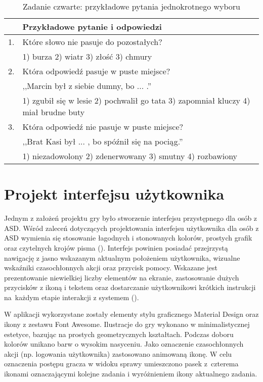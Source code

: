     \begin{table}
        \caption{Zadanie czwarte: przykładowe pytania jednokrotnego wyboru}
        \label{table:zadanie4}
        \begin{tabularx}{\textwidth}{ l X }
         \hline
        
         \hline
            & \textbf{Przykładowe pytanie i odpowiedzi} \\
         \hline
         1. & Które słowo nie pasuje do pozostałych? \\
            & 1) burza 2) wiatr 3) złość 3) chmury \\
         2. & Która odpowiedź pasuje w puste miejsce? \\
            & ,,Marcin był z siebie dumny, bo ... .'' \\
            & 1) zgubił się w lesie 2) pochwalił go tata 3) zapomniał kluczy 4) miał brudne buty \\
         3. & Która odpowiedź nie pasuje w puste miejsce? \\
            & ,,Brat Kasi był ... , bo spóźnił się na pociąg.'' \\
            & 1) niezadowolony 2) zdenerwowany 3) smutny 4) rozbawiony  \\
         \hline
         
         \hline
        \end{tabularx}
    \end{table}

\section{Projekt interfejsu użytkownika}
    Jednym z założeń projektu gry było stworzenie interfejsu przystępnego dla osób z ASD.
    Wśród zaleceń dotyczących projektowania interfejsu użytkownika dla osób z ASD wymienia się stosowanie łagodnych i stonowanych kolorów, prostych grafik oraz czytelnych krojów pisma (\cite{pavlov2014user}).
    Interfejs powinien posiadać przejrzystą nawigację z jasno wskazanym aktualnym położeniem użytkownika, wizualne wskaźniki czasochłonnych akcji oraz przycisk pomocy.
    Wskazane jest prezentowanie niewielkiej liczby elementów na ekranie, zastosowanie dużych przycisków z ikoną i tekstem oraz dostarczanie użytkownikowi krótkich instrukcji na~każdym etapie interakcji z systemem (\cite{pavlov2014user}).
    
    W aplikacji wykorzystane zostały elementy stylu graficznego Material Design oraz ikony z zestawu Font Awesome.
    Ilustracje do gry wykonano w minimalistycznej estetyce, bazując na prostych geometrycznych kształtach.
    Podczas doboru kolorów unikano barw o wysokim nasyceniu.
    Jako oznaczenie czasochłonnych akcji (np. logowania użytkownika) zastosowano animowaną ikonę.
    W celu oznaczenia postępu gracza w widoku sprawy umieszczono pasek z~czterema ikonami oznaczającymi kolejne zadania i wyróżnieniem ikony aktualnego zadania.
    
